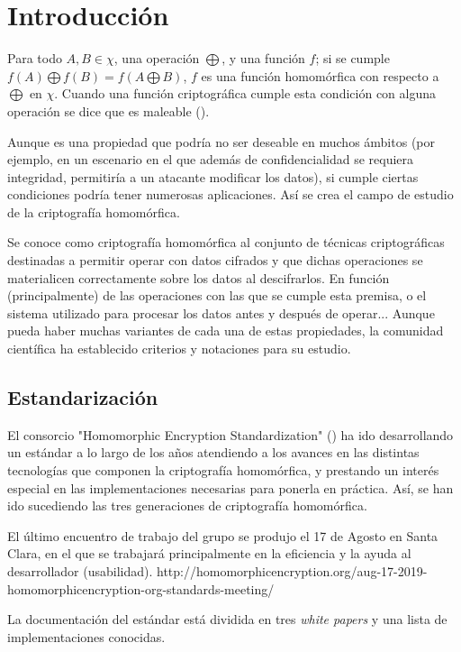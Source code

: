 \chapter{Introducción}
\label{chap:intro}

Para todo $ A,B \in \chi{} $, una operación $ \bigoplus $, y una función $f$; si se cumple $ f(A) \bigoplus f(B) = f(A \bigoplus B)$, $ f $ es una función homomórfica con respecto a $ \bigoplus $ en $ \chi{} $. Cuando una función criptográfica cumple esta condición con alguna operación se dice que es maleable (\cite{dolev_non-malleable_1991}).

Aunque es una propiedad que podría no ser deseable en muchos ámbitos (por ejemplo, en un escenario en el que además de confidencialidad se requiera integridad, permitiría a un atacante modificar los datos), si cumple ciertas condiciones podría tener numerosas aplicaciones. Así se crea el campo de estudio de la criptografía homomórfica.

Se conoce como criptografía homomórfica al conjunto de técnicas criptográficas destinadas a permitir operar con datos cifrados y que dichas operaciones se materialicen correctamente sobre los datos al descifrarlos. En función (principalmente) de las operaciones con las que se cumple esta premisa, o el sistema utilizado para procesar los datos antes y después de operar... Aunque pueda haber muchas variantes de cada una de estas propiedades, la comunidad científica ha establecido criterios y notaciones para su estudio.

\section{Estandarización}

El consorcio "Homomorphic Encryption Standardization" (\cite{albrecht_homomorphic_2018}) ha ido desarrollando un estándar a lo largo de los años atendiendo a los avances en las distintas tecnologías que componen la criptografía homomórfica, y prestando un interés especial en las implementaciones necesarias para ponerla en práctica. Así, se han ido sucediendo las tres generaciones de criptografía homomórfica.

El último encuentro de trabajo del grupo se produjo el 17 de Agosto en Santa Clara, en el que se trabajará principalmente en la eficiencia y la ayuda al desarrollador (usabilidad). http://homomorphicencryption.org/aug-17-2019-homomorphicencryption-org-standards-meeting/

La documentación del estándar está dividida en tres \textit{white papers} y una lista de implementaciones conocidas.

